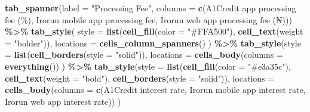 \documentclass[
]{article}
\newenvironment{Shaded}{\begin{snugshade}}{\end{snugshade}}
\newcommand{\AttributeTok}[1]{\textcolor[rgb]{0.13,0.29,0.53}{#1}}
\newcommand{\FunctionTok}[1]{\textcolor[rgb]{0.13,0.29,0.53}{\textbf{#1}}}
\newcommand{\NormalTok}[1]{#1}
\newcommand{\SpecialCharTok}[1]{\textcolor[rgb]{0.81,0.36,0.00}{\textbf{#1}}}
\newcommand{\StringTok}[1]{\textcolor[rgb]{0.31,0.60,0.02}{#1}}
\begin{document}
\begin{Shaded}
\begin{Highlighting}[]
  \FunctionTok{tab\_spanner}\NormalTok{(}\AttributeTok{label =} \StringTok{"Processing Fee"}\NormalTok{, }\AttributeTok{columns =} \FunctionTok{c}\NormalTok{(}\StringTok{\textasciigrave{}}\AttributeTok{A1Credit app processing fee (\%)}\StringTok{\textasciigrave{}}\NormalTok{, }\StringTok{\textasciigrave{}}\AttributeTok{Irorun mobile app processing fee}\StringTok{\textasciigrave{}}\NormalTok{, }\StringTok{\textasciigrave{}}\AttributeTok{Irorun web app processing fee (₦)}\StringTok{\textasciigrave{}}\NormalTok{)) }\SpecialCharTok{\%\textgreater{}\%}
  \FunctionTok{tab\_style}\NormalTok{(}
    \AttributeTok{style =} \FunctionTok{list}\NormalTok{(}\FunctionTok{cell\_fill}\NormalTok{(}\AttributeTok{color =} \StringTok{"\#FFA500"}\NormalTok{),}
                 \FunctionTok{cell\_text}\NormalTok{(}\AttributeTok{weight =} \StringTok{"bolder"}\NormalTok{)),}
    \AttributeTok{locations =} \FunctionTok{cells\_column\_spanners}\NormalTok{()}
\NormalTok{  ) }\SpecialCharTok{\%\textgreater{}\%}
  \FunctionTok{tab\_style}\NormalTok{(}\AttributeTok{style =} \FunctionTok{list}\NormalTok{(}\FunctionTok{cell\_borders}\NormalTok{(}\AttributeTok{style =} \StringTok{"solid"}\NormalTok{)), }\AttributeTok{locations =} \FunctionTok{cells\_body}\NormalTok{(}\AttributeTok{columns =} \FunctionTok{everything}\NormalTok{())}
\NormalTok{            ) }\SpecialCharTok{\%\textgreater{}\%} 
  \FunctionTok{tab\_style}\NormalTok{(}\AttributeTok{style =} \FunctionTok{list}\NormalTok{(}\FunctionTok{cell\_fill}\NormalTok{(}\AttributeTok{color =} \StringTok{"\#e3a35c"}\NormalTok{),}
                         \FunctionTok{cell\_text}\NormalTok{(}\AttributeTok{weight =} \StringTok{"bold"}\NormalTok{), }\FunctionTok{cell\_borders}\NormalTok{(}\AttributeTok{style =} \StringTok{"solid"}\NormalTok{)),}
            \AttributeTok{locations =} \FunctionTok{cells\_body}\NormalTok{(}\AttributeTok{columns =} \FunctionTok{c}\NormalTok{(}\StringTok{\textasciigrave{}}\AttributeTok{A1Credit interest rate}\StringTok{\textasciigrave{}}\NormalTok{, }\StringTok{\textasciigrave{}}\AttributeTok{Irorun mobile app interest rate}\StringTok{\textasciigrave{}}\NormalTok{, }\StringTok{\textasciigrave{}}\AttributeTok{Irorun web app interest rate}\StringTok{\textasciigrave{}}\NormalTok{))}
\NormalTok{            )}
\end{Highlighting}
\end{Shaded}
\end{document}
